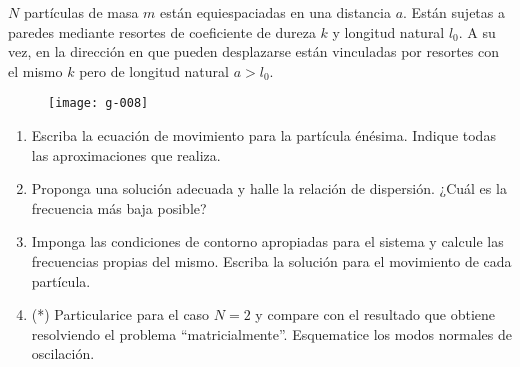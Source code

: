 \item
\(N\) partículas de masa \(m\) están equiespaciadas en una distancia \(a\).
Están sujetas a paredes mediante resortes de coeficiente de dureza \(k\) y longitud natural \(l_0\).
A su vez, en la dirección en que pueden desplazarse están vinculadas por resortes con el mismo \(k\) pero de longitud natural \(a > l_0\).
\begin{figure}[ht]
	\centering
	\texttt{[image: g-008]}
\end{figure}
\begin{enumerate}
	\item Escriba la ecuación de movimiento para la partícula énésima.
	Indique todas las aproximaciones que realiza.
	\item Proponga una solución adecuada y halle la relación de dispersión.
	¿Cuál es la frecuencia más baja posible?
	\item Imponga las condiciones de contorno apropiadas para el sistema y calcule las frecuencias propias del mismo.
	Escriba la solución para el movimiento de cada partícula.
	\item (*) Particularice para el caso \(N = 2\) y compare con el resultado que obtiene resolviendo el problema ``matricialmente''.
	Esquematice los modos normales de oscilación.
\end{enumerate}



